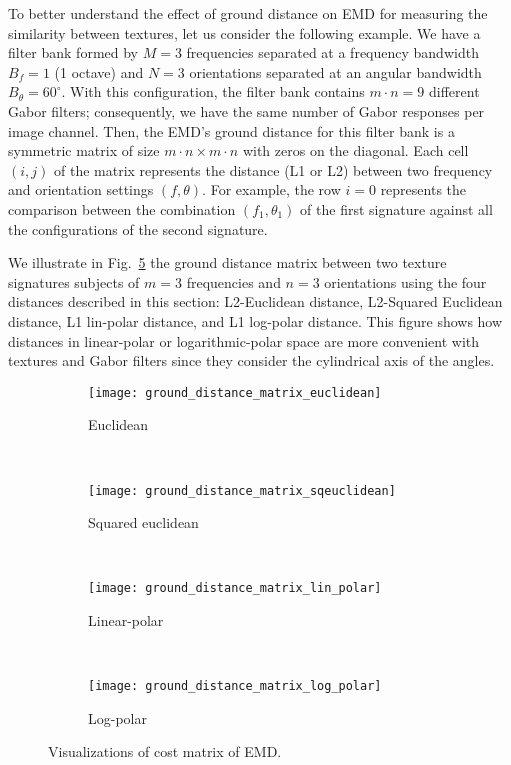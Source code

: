 To better understand the effect of ground distance on EMD for measuring the similarity between textures, let us consider the following example. We have a filter bank formed by $M = 3$ frequencies separated at a frequency bandwidth $B_f = 1$ (1 octave) and $N = 3$ orientations separated at an angular bandwidth $B_\theta = 60^\circ$. With this configuration, the filter bank contains $ m \cdot n = 9 $ different Gabor filters; consequently, we have the same number of Gabor responses per image channel. Then, the EMD's ground distance for this filter bank is a symmetric matrix of size $ m \cdot n \times m \cdot n $ with zeros on the diagonal. Each cell $(i, j)$ of the matrix represents the distance (L1 or L2) between two frequency and orientation settings $(f,\theta)$. For example, the row $i = 0$ represents the comparison between the combination $(f_1, \theta_1)$ of the first signature against all the configurations of the second signature.

We illustrate in Fig.\ \ref{fig:EMD_ground_distance_matrix} the ground distance matrix between two texture signatures subjects of $m = 3$ frequencies and $n = 3$ orientations using the four distances described in this section: L2-Euclidean distance, L2-Squared Euclidean distance, L1 lin-polar distance, and L1 log-polar distance. This figure shows how distances in linear-polar or logarithmic-polar space are more convenient with textures and Gabor filters since they consider the cylindrical axis of the angles.

\begin{figure}[!ht]
    \centering
    \begin{subfigure}[b]{0.47\textwidth}
		\texttt{[image: ground\_distance\_matrix\_euclidean]}	
		\caption{Euclidean}
        \label{fig:ground_distance_matrix_euclidean}
	\end{subfigure}
	~ %
    \begin{subfigure}[b]{0.47\textwidth}
		\texttt{[image: ground\_distance\_matrix\_sqeuclidean]}	
		\caption{Squared euclidean}
        \label{fig:ground_distance_matrix_sqeuclidean}
	\end{subfigure} \\[2ex]
    
    \begin{subfigure}[b]{0.47\textwidth}
		\texttt{[image: ground\_distance\_matrix\_lin\_polar]}	
		\caption{Linear-polar}
        \label{fig:ground_distance_matrix_lin_polar}
	\end{subfigure}  
	~ %
	\begin{subfigure}[b]{0.47\textwidth}
		\texttt{[image: ground\_distance\_matrix\_log\_polar]}	
		\caption{Log-polar}
        \label{fig:ground_distance_matrix_log_polar}
	\end{subfigure}  
	   
   \caption{Visualizations of cost matrix of EMD.}
   \label{fig:EMD_ground_distance_matrix}
\end{figure}


